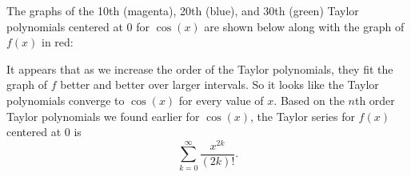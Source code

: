 \begin{activitySolution}
\item The graphs of the 10th (magenta), 20th (blue), and 30th (green) Taylor polynomials centered at 0 for $\cos(x)$ are shown below along with the graph of $f(x)$ in red:
\begin{center}  \end{center}
It appears that as we increase the order of the Taylor polynomials, they fit the graph of $f$ better and better over larger intervals. So it looks like the Taylor polynomials converge to $\cos(x)$ for every value of $x$.
Based on the $n$th order Taylor polynomials we found earlier for $\cos(x)$, the Taylor series for $f(x)$ centered at 0 is
\[\sum_{k=0}^{\infty} \frac{x^{2k}}{(2k)!}.\]


\end{activitySolution}
